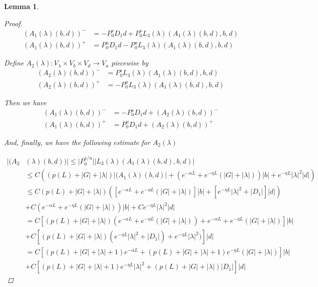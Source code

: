 \documentclass[12pt]{article}
\newtheorem{lemma}{Lemma}
\begin{document}
\begin{lemma}
\begin{proof}
\begin{align*}
(A_1(\lambda)(b,d))^- &= -P_0^s D_1 d + P_0^s L_3(\lambda)(A_1(\lambda)(b,d),b,d) \\
(A_1(\lambda)(b,d))^+ &= P_0^u D_1 d - P_0^u L_3(\lambda)(A_1(\lambda)(b,d),b,d)
\end{align*}

Define $A_2(\lambda): V_\lambda \times V_b \times V_d \rightarrow V_a$ piecewise by
\begin{align*}
(A_2(\lambda)(b,d))^- &= P_0^s L_3(\lambda)(A_1(\lambda)(b,d),b,d) \\
(A_2(\lambda)(b,d))^+ &= - P_0^u L_3(\lambda)(A_1(\lambda)(b,d),b,d)
\end{align*}

Then we have
\begin{align*}
(A_1(\lambda)(b,d))^- &= -P_0^s D_1 d + (A_2(\lambda)(b,d))^-\\
(A_1(\lambda)(b,d))^+ &= P_0^u D_1 d + (A_2(\lambda)(b,d))^+
\end{align*}

And, finally, we have the following estimate for $A_2(\lambda)$

\begin{align*}
|(A_2&(\lambda)(b,d))| \leq |P_0^{s/u}|| L_3(\lambda)(A_1(\lambda)(b,d),b,d) |\\
&\leq C \left( \left( p(L) + |G| + |\lambda|\right) |(A_1(\lambda)(b,d)| + \left( e^{-\alpha L} + e^{-\eta L} \left(|G| + |\lambda|\right) \right) |b| + e^{-\eta L} |\lambda|^2 |d| \right)\\
&\leq C \left( p(L) + |G| + |\lambda|\right) \left( \left[e^{-\alpha L} + e^{-\eta L} \left(|G| + |\lambda|\right) \right]|b| + \left[ e^{-\eta L} |\lambda|^2 + |D_1| \right] |d| \right) \\
&+ C\left( e^{-\alpha L} + e^{-\eta L} \left(|G| + |\lambda|\right) \right) |b| + C e^{-\eta L} |\lambda|^2 |d| \\
&= C \left[ \left( p(L) + |G| + |\lambda| \right) \left( e^{-\alpha L} + e^{-\eta L} \left(|G| + |\lambda|\right)\right) +  e^{-\alpha L} + e^{-\eta L} \left(|G| + |\lambda|\right) \right] |b| \\
&+ C \left[  \left( p(L) + |G| + |\lambda| \right)(e^{-\eta L} |\lambda|^2 + |D_1|) + e^{-\eta L} |\lambda|^2) \right]|d| \\
&= C \left[ \left( p(L) + |G| + |\lambda| + 1 \right) e^{-\alpha L} + \left( p(L) + |G| + |\lambda| + 1 \right) e^{-\eta L} \left(|G| + |\lambda|\right)\right] |b| \\
&+ C \left[ \left( p(L) + |G| + |\lambda| + 1 \right)e^{-\eta L} |\lambda|^2 + \left( p(L) + |G| + |\lambda| \right)|D_1| \right]|d| 
\end{align*}


\end{proof}
\end{lemma}
\end{document}

